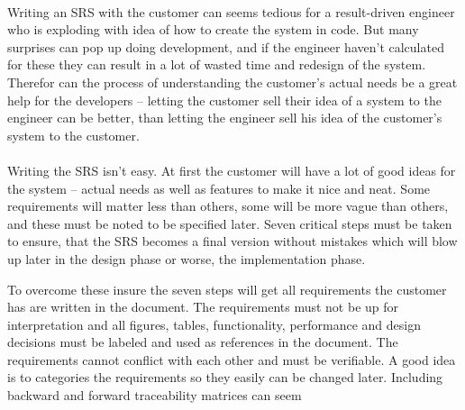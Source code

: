 \\
Writing an SRS with the customer can seems tedious for a result-driven engineer who is exploding with idea of how to create the system in code.
But many surprises can pop up doing development, and if the engineer haven't calculated for these they can result in a lot of wasted time and redesign of the system.
Therefor can the process of understanding the customer's actual needs be a great help for the developers -- letting the customer sell their idea of a system to the engineer can be better, than letting the engineer sell his idea of the customer's system to the customer.
\\
\\
Writing the SRS isn't easy.
At first the customer will have a lot of good ideas for the system -- actual needs as well as features to make it nice and neat.
Some requirements will matter less than others, some will be more vague than others, and these must be noted to be specified later.
Seven critical steps must be taken to ensure, that the SRS becomes a final version without mistakes which will blow up later in the design phase or worse, the implementation phase.

To overcome these insure the seven steps will get all requirements the customer has are written in the document.
The requirements must not be up for interpretation and all figures, tables, functionality, performance and design decisions must be labeled and used as references in the document.
The requirements cannot conflict with each other and must be verifiable. 
A good idea is to categories the requirements so they easily can be changed later.
Including backward and forward traceability matrices can seem 






